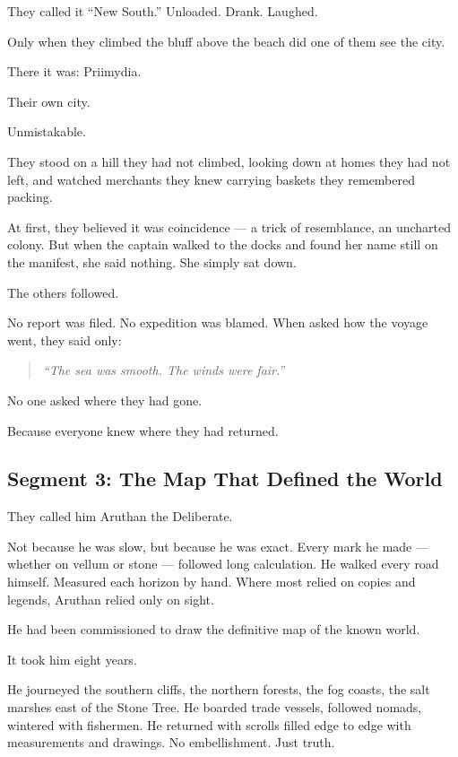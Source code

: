 \documentclass[9pt]{article}
\begin{document}
They called it ``New South.'' Unloaded. Drank. Laughed.

Only when they climbed the bluff above the beach did one of them see the city.

There it was: Priimydia.

Their own city.

Unmistakable.

They stood on a hill they had not climbed, looking down at homes they had not left, and watched merchants they knew carrying baskets they remembered packing.

At first, they believed it was coincidence — a trick of resemblance, an uncharted colony. But when the captain walked to the docks and found her name still on the manifest, she said nothing. She simply sat down.

The others followed.

No report was filed. No expedition was blamed. When asked how the voyage went, they said only:

\begin{quote}
\emph{``The sea was smooth. The winds were fair.''}
\end{quote}

No one asked where they had gone.

Because everyone knew where they had returned.

\newpage

\subsection*{Segment 3: The Map That Defined the World}

They called him Aruthan the Deliberate.

Not because he was slow, but because he was exact. Every mark he made — whether on vellum or stone — followed long calculation. He walked every road himself. Measured each horizon by hand. Where most relied on copies and legends, Aruthan relied only on sight.

He had been commissioned to draw the definitive map of the known world.

It took him eight years.

He journeyed the southern cliffs, the northern forests, the fog coasts, the salt marshes east of the Stone Tree. He boarded trade vessels, followed nomads, wintered with fishermen. He returned with scrolls filled edge to edge with measurements and drawings. No embellishment. Just truth.
\end{document}
